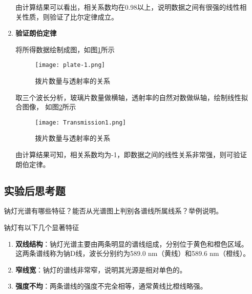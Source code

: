 \documentclass[dvipsnames, svgnames,a4paper,11pt]{article}
\begin{document}
\begin{enumerate}
				由计算结果可以看出，相关系数均在0.98以上，说明数据之间有很强的线性相关性质，则验证了比尔定律成立。
				
				
				
			\item \textbf{验证朗伯定律}
				
				将所得数据绘制成图，如图\ref{fig:plate-1}所示
		
				\begin{figure}[htbp]
					\centering
					\texttt{[image: plate-1.png]}
					\caption{拨片数量与透射率的关系}
					\label{fig:plate-1}
				\end{figure}
			
				取三个波长分析，玻璃片数量做横轴，透射率的自然对数做纵轴，绘制线性拟合图像， 如图\ref{fig:Transmission1}所示
				
				\begin{figure}[htbp]
					\centering
					\texttt{[image: Transmission1.png]}
					\caption{拨片数量与透射率的关系}
					\label{fig:Transmission1}
				\end{figure}
				
				由计算结果可知，相关系数均为-1，即数据之间的线性关系非常强，则可验证朗伯定律。
	
		\end{enumerate}
			
		
		
\subsection{实验后思考题}



\begin{question}
	 钠灯光谱有哪些特征？能否从光谱图上判别各谱线所属线系？举例说明。
\end{question}
	
	钠灯有以下几个显著特征
	\begin{enumerate}
		\item \textbf{双线结构}：钠灯光谱主要由两条明显的谱线组成，分别位于黄色和橙色区域。这两条谱线称为钠D线，波长分别约为589.0 nm（黄线）和589.6 nm（橙线）。
		
		\item \textbf{窄线宽}：钠灯的谱线非常窄，说明其光源是相对单色的。
		
		\item \textbf{强度不均}：两条谱线的强度不完全相等，通常黄线比橙线略强。
	\end{enumerate}
	
\end{document}
